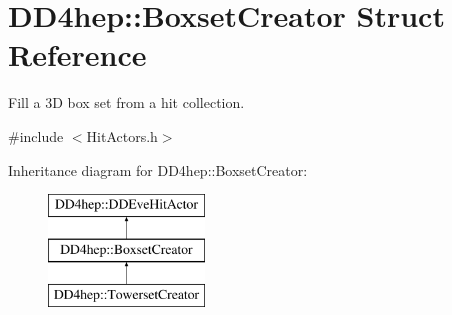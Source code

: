 \hypertarget{struct_d_d4hep_1_1_boxset_creator}{}\section{D\+D4hep\+:\+:Boxset\+Creator Struct Reference}
\label{struct_d_d4hep_1_1_boxset_creator}


Fill a 3D box set from a hit collection.  




{\ttfamily \#include $<$Hit\+Actors.\+h$>$}

Inheritance diagram for D\+D4hep\+:\+:Boxset\+Creator\+:\begin{figure}[H]
\begin{center}
\leavevmode
\includegraphics[height=3.000000cm]{struct_d_d4hep_1_1_boxset_creator}
\end{center}
\end{figure}
